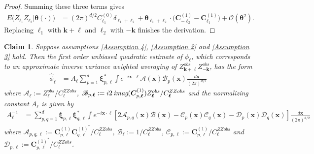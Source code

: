 \documentclass[10pt,noinfoline]{imsart}
\newtheorem{claim}{Claim}
\newcommand{\bs}{\boldsymbol}
\begin{document}
\begin{proof}
Summing these three terms gives
\begin{align*}
E\big(Z_{\bs \ell_1}Z_{\bs \ell_2}|\bs \theta(\cdot)\big) &= {(2\pi)}^{d/2}C^{(0)}_{\bs \ell_1} \delta_{\bs \ell_1+\bs \ell_2}
+ \bs\theta_{\bs \ell_1+\bs \ell_2}\cdot\big(\bs C^{(1)}_{-\bs \ell_2} -\bs C_{\bs \ell_1}^{(1)}\big) + \mathcal O(\bs\theta^2).
\end{align*}
Replacing $\bs \ell_1$ with  $\bs k+\bs \ell$  and $\bs \ell_2$ with $-\bs k$ finishes the derivation.
\end{proof}



%
%

\begin{claim}\label{appendix, claim: quad est derivations}
Suppose assumptions \ref{Assumption 4}, \ref{Assumption 2} and \ref{Assumption 3} hold. Then the first order unbiased quadratic estimate of $\phi_{\bs \ell}$, which corresponds to an approximate inverse variance weighted averaging of $Z_{\bs k+\bs \ell}^{obs}Z_{-\bs k}^{obs}$, has the form
    \begin{align}
        \label{appendix-claim def of quad est}
        \hat\phi_{\bs \ell} &=   A_{\bs \ell}\sum_{p=1}^d \bs\xi^*_{p,\bs\ell} \int
        e^{-i\bs x\cdot\bs\ell}
        \mathscr A(\bs x)\mathscr B_{p}(\bs x) \frac{d\bs x}{{(2\pi)}^{d/2}}
    \end{align}
    where $\mathscr A_{\bs \ell}:= Z^{obs}_{\bs \ell}/ C^{ZZobs}_{\bs \ell}$,  $\mathscr B_{p,\bs\ell} := i 2 \textit{\,imag}(\bs C^{(1)}_{p,\bs \ell}) Z^{obs}_{\bs\ell} / C^{ZZobs}_{\bs \ell}$ and 
    the normalizing constant
    $A_{\bs\ell}$ is given by
    \begin{align}
        \label{appendix-claim def of Aℓinv}
        A_{\bs\ell}^{-1} &= \sum_{p,q = 1}^d\bs\xi_{p,\bs \ell}\bs\xi^*_{q,\bs \ell}\int  e^{-i\bs x\cdot\bs\ell} \left[2\mathscr A_{p,q}(\bs x)\mathscr B(\bs x)  - \mathscr C_{p}(\bs x)\mathscr C_{q}(\bs x) -  \mathscr D_{p}(\bs x)\mathscr D_{q}(\bs x)\right]  \frac{d\bs x}{{(2\pi)}^{d/2}}
    \end{align}
    where $\mathscr A_{p,q, \bs \ell}:= \bs C^{(1)}_{p,\bs\ell} \bs C^{{(1)}^*}_{q,\bs\ell}  / C^{ZZobs}_{\bs\ell}$, $\mathscr B_{\bs\ell}:= 1/C^{ZZobs}_{\bs\ell}$, $\mathscr C_{p,\bs\ell}:= \bs C^{(1)}_{p,\bs\ell}  / C^{ZZobs}_{\bs\ell}$ and $\mathscr D_{p,\bs\ell}:= \bs C^{{(1)}^*}_{p,\bs\ell}  / C^{ZZobs}_{\bs\ell}$.
\end{claim}
\end{document}

